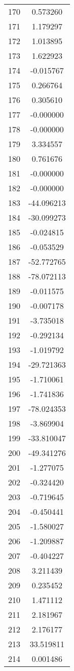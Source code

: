 \documentclass[12pt]{article}
\begin{document}
\begin{longtable}{@{}cc@{}}
170 & 0.573260 \\
171 & 1.179297 \\
172 & 1.013895 \\
173 & 1.622923 \\
174 & -0.015767 \\
175 & 0.266764 \\
176 & 0.305610 \\
177 & -0.000000 \\
178 & -0.000000 \\
179 & 3.334557 \\
180 & 0.761676 \\
181 & -0.000000 \\
182 & -0.000000 \\
183 & -44.096213 \\
184 & -30.099273 \\
185 & -0.024815 \\
186 & -0.053529 \\
187 & -52.772765 \\
188 & -78.072113 \\
189 & -0.011575 \\
190 & -0.007178 \\
191 & -3.735018 \\
192 & -0.292134 \\
193 & -1.019792 \\
194 & -29.721363 \\
195 & -1.710061 \\
196 & -1.741836 \\
197 & -78.024353 \\
198 & -3.869904 \\
199 & -33.810047 \\
200 & -49.341276 \\
201 & -1.277075 \\
202 & -0.324420 \\
203 & -0.719645 \\
204 & -0.450441 \\
205 & -1.580027 \\
206 & -1.209887 \\
207 & -0.404227 \\
208 & 3.211439 \\
209 & 0.235452 \\
210 & 1.471112 \\
211 & 2.181967 \\
212 & 2.176177 \\
213 & 33.519811 \\
214 & 0.001486 \\

\end{longtable}
\end{document}
